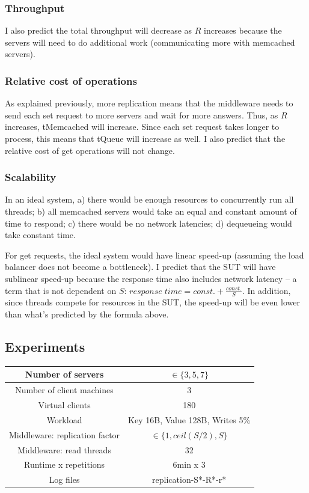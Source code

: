 \documentclass[11pt]{article}
\begin{document}
\subsubsection{Throughput}
I also predict the total throughput will decrease as $R$ increases because the servers will need to do additional work (communicating more with memcached servers).

\subsubsection{Relative cost of operations}
As explained previously, more replication means that the middleware needs to send each set request to more servers and wait for more answers. Thus, as $R$ increases, tMemcached will increase. Since each set request takes longer to process, this means that tQueue will increase as well. I also predict that the relative cost of get operations will not change.

\subsubsection{Scalability}
\label{sec:exp2:hyp:scalability}

In an ideal system, a) there would be enough resources to concurrently run all threads; b) all memcached servers would take an equal and constant amount of time to respond; c) there would be no network latencies; d) dequeueing would take constant time.

For get requests, the ideal system would have linear speed-up (assuming the load balancer does not become a bottleneck). I predict that the SUT will have sublinear speed-up because the response time also includes network latency -- a term that is not dependent on $S$: $response \; time = const. + \frac{const.}{S}$. In addition, since threads compete for resources in the SUT, the speed-up will be even lower than what's predicted by the formula above.

\subsection{Experiments}
\begin{center}
\small{
\smallskip
\begin{tabular}{|c|c|}
\hline Number of servers & $\in \{3, 5, 7\}$ \\ 
\hline Number of client machines & 3 \\ 
\hline Virtual clients & 180 \\ 
\hline Workload & Key 16B, Value 128B, Writes 5\% \\
\hline Middleware: replication factor & $\in \{1, ceil(S/2), S\}$ \\ 
\hline Middleware: read threads & 32 \\ 
\hline Runtime x repetitions & 6min x 3 \\ 
\hline Log files & replication-S*-R*-r* \\
\hline 
\end{tabular} }
\end{center}
\end{document}
